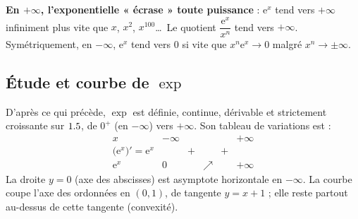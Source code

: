 \begin{aretenir}
\textbf{En $+\infty$, l'exponentielle « écrase » toute puissance} : $\mathrm{e}^{x}$ tend vers
$+\infty$ infiniment plus vite que $x$, $x^{2}$, $x^{100}$\dots\ Le quotient
$\dfrac{\mathrm{e}^{x}}{x^{n}}$ tend vers $+\infty$. Symétriquement, en $-\infty$, $\mathrm{e}^{x}$
tend vers $0$ si vite que $x^{n}\mathrm{e}^{x}\to 0$ malgré $x^{n}\to\pm\infty$.
\end{aretenir}

\subsection*{Étude et courbe de $\exp$}

D'après ce qui précède, $\exp$ est définie, continue, dérivable et strictement croissante sur
$1.5$, de $0^{+}$ (en $-\infty$) vers $+\infty$. Son tableau de variations est :
\[
\begin{array}{c|ccccc}
x & -\infty & & & & +\infty\\\hline
\big(\mathrm{e}^{x}\big)'=\mathrm{e}^{x} & & + & & + & \\\hline
\mathrm{e}^{x} & 0 & & \nearrow & & +\infty
\end{array}
\]
La droite $y=0$ (axe des abscisses) est asymptote horizontale en $-\infty$. La courbe coupe
l'axe des ordonnées en $(0,1)$, de tangente $y=x+1$ ; elle reste partout au-dessus de cette
tangente (convexité).

\begin{illus}
\end{illus}

